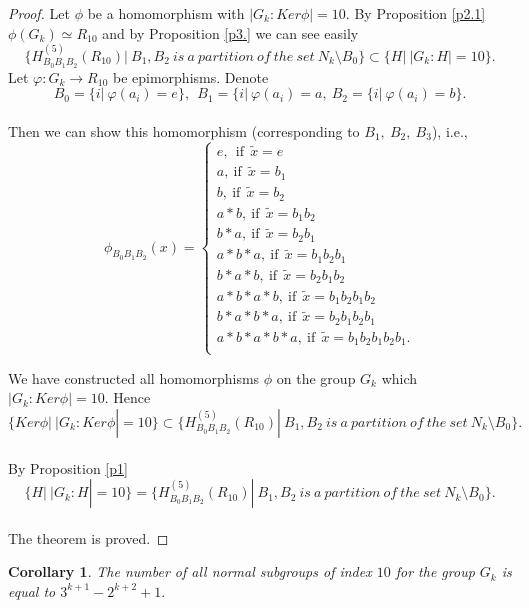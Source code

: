\documentclass[12pt,reqno]{amsart}
\newtheorem{cor}{Corollary}
\numberwithin{equation}{section}
\begin{document}
\begin{proof} Let $\phi$ be a homomorphism with
$|G_{k}:Ker\phi|=10.$ By Proposition \ref{p2.1} $\phi(G_{k})\simeq
R_{10}$ and by Proposition \ref{p3.} we can see easily
$$\{H^{(5)}_{B_{0}B_{1}B_{2}}(R_{10})|\ B_{1},
B_{2} \ is\ a\ partition\ of\ the\ set\ N_{k}\setminus
B_{0}\}\subset \{H|\ |G_{k}:H|=10\}.$$
 Let $\varphi: G_{k}\rightarrow R_{10}$ be epimorphisms. Denote\\
$$B_{0}=\{i| \ \varphi(a_{i})=e\}, \ \ B_{1}=\{i| \ \varphi(a_{i})=a,\  B_{2}=\{i| \
\varphi(a_{i})=b\}.$$\\
Then we can show this homomorphism (corresponding to $B_{1},\
B_{2},\ B_{3}$), i.e.,\\
$$\phi_{B_{0}B_{1}B_{2}}(x)=\left\{\begin{array}{ll}
e, \ \ \mbox{if} \ \ \tilde{x}=e\\[2.5mm]
a, \ \mbox{if}\ \ \tilde{x}=b_{1} \\[2.5mm]
b, \ \mbox{if} \ \ \tilde{x}=b_{2} \\[2.5mm]
a\ast b, \ \mbox{if} \ \ \tilde{x}=b_{1}b_{2}\\[2.5mm]
b\ast a, \ \mbox{if}\ \ \tilde{x}=b_{2}b_{1} \\[2.5mm]
a\ast b\ast a, \ \mbox{if}\ \ \tilde{x}=b_{1}b_{2}b_{1} \\[2.5mm]
b\ast a\ast b, \ \mbox{if}\ \ \tilde{x}=b_{2}b_{1}b_{2} \\[2.5mm]
a\ast b\ast a\ast b, \ \mbox{if}\ \ \tilde{x}=b_{1}b_{2}b_{1}b_{2} \\[2.5mm]
b\ast a\ast b\ast a, \ \mbox{if}\ \ \tilde{x}=b_{2}b_{1}b_{2}b_{1} \\[2.5mm]
a\ast b\ast a\ast b\ast a, \ \mbox{if}\ \ \tilde{x}=b_{1}b_{2}b_{1}b_{2}b_{1}. \\
\end{array}\right.$$

 We have constructed all homomorphisms $\phi$ on the group
$G_{k}$ which $|G_{k}:Ker\phi|=10.$ Hence\\
$$\{Ker\phi|\ |G_{k}:Ker\phi|=10\}\subset \{H^{(5)}_{B_{0}B_{1}B_{2}}(R_{10})|\ B_{1},
B_{2} \ is\ a\ partition\ of\ the\ set\ N_{k}\setminus
B_{0}\}.$$\\
By Proposition \ref{p1}\\
$$\{H|\ |G_{k}:H|=10\}=\{H^{(5)}_{B_{0}B_{1}B_{2}}(R_{10})|\ B_{1},
B_{2} \ is\ a\ partition\ of\ the\ set\ N_{k}\setminus
B_{0}\}.$$\\
 The theorem is proved.\end{proof}
\begin{cor}\label{c2} The number of all normal subgroups of
index $10$ for the group $G_{k}$ is equal to $3^{k+1}-2^{k+2}+1.$
\end{cor}
\end{document}

